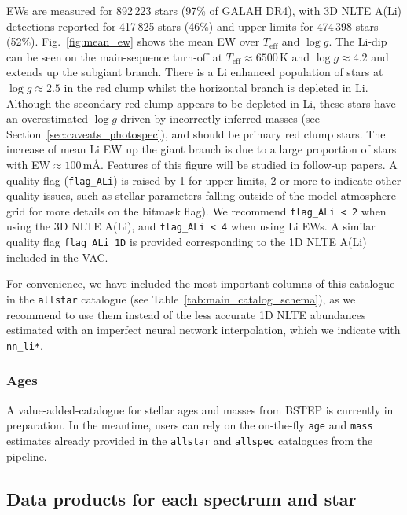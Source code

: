 \documentclass[
  journal=pasa,
  manuscript=research-paper, %
  year=2024,
  volume=37
]{cup-journal}
\newcommand{\Teff}{$T_\mathrm{eff}$\xspace}
\newcommand{\logg}{$\log g$\xspace}
\begin{document}
EWs are measured for 892\,223 stars (97\% of GALAH DR4), with 3D NLTE A(Li) detections reported for 417\,825 stars (46\%) and upper limits for 474\,398 stars (52\%). Fig.~\ref{fig:mean_ew} shows the mean EW over \Teff and \logg. The Li-dip can be seen on the main-sequence turn-off at \Teff$\approx 6500$\,K and \logg$\approx 4.2$ and extends up the subgiant branch. There is a Li enhanced population of stars at \logg$\approx 2.5$ in the red clump whilst the horizontal branch is depleted in Li. Although the secondary red clump appears to be depleted in Li, these stars have an overestimated \logg driven by incorrectly inferred masses (see Section~\ref{sec:caveats_photospec}), and should be primary red clump stars. The increase of mean Li EW up the giant branch is due to a large proportion of stars with EW$\approx 100$\,m\AA. Features of this figure will be studied in follow-up papers. 
A quality flag (\texttt{flag\_ALi}) is raised by 1 for upper limits, 2 or more to indicate other quality issues, such as stellar parameters falling outside of the model atmosphere grid \citep[see][]{Wang2024} for more details on the bitmask flag). We recommend \texttt{flag\_ALi < 2} when using the 3D NLTE A(Li), and \texttt{flag\_ALi < 4} when using Li EWs. A similar quality flag \texttt{flag\_ALi\_1D} is provided corresponding to the 1D NLTE A(Li) included in the VAC. 

For convenience, we have included the most important columns of this catalogue in the \texttt{allstar} catalogue (see Table~\ref{tab:main_catalog_schema}), as we recommend to use them instead of the less accurate 1D NLTE abundances estimated with an imperfect neural network interpolation, which we indicate with \texttt{nn\_li*}.

\subsubsection{Ages}

A value-added-catalogue for stellar ages and masses from BSTEP \citep{Sharma2018} is currently in preparation. In the meantime, users can rely on the on-the-fly \texttt{age} and \texttt{mass} estimates already provided in the \texttt{allstar} and \texttt{allspec} catalogues from the pipeline.

\subsection{Data products for each spectrum and star}
\label{sec:data_products_for_each_spectrum}
\end{document}
